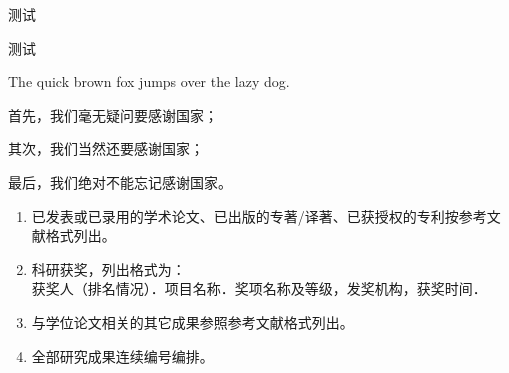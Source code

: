 \documentclass[
    doctor,
    pdflinks,
    ]{xjtuthesis}
\begin{document}

                    测试


                        测试



                The quick brown fox jumps over the lazy dog.

    \xjtuendappendix


        首先，我们毫无疑问要感谢国家；

        其次，我们当然还要感谢国家；

        最后，我们绝对不能忘记感谢国家。


        \begin{enumerate}
            \item 已发表或已录用的学术论文、已出版的专著/译著、已获授权的专利按参考文献格式列出。
            \item 科研获奖，列出格式为：\\
                获奖人（排名情况）．项目名称．奖项名称及等级，发奖机构，获奖时间．
            \item 与学位论文相关的其它成果参照参考文献格式列出。
            \item 全部研究成果连续编号编排。
        \end{enumerate}

    \xjtuacademicintegrity
\end{document}
